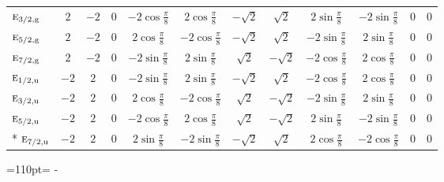 \documentclass[10pt,a4paper]{article}
\newcommand{\needspace}[1]{\par\penalty-100\begingroup\dimen0=#1\relax\dimen2=\pagegoal
  \advance\dimen2-\pagetotal\ifdim\dimen0>\dimen2\relax\ifdim\dimen2>0pt\vfil\break\fi\fi
  \endgroup}
\numberwithin{equation}{section}
\newcommand{\irr}[1]{\text{\normalfont\scshape #1}}
\newcommand{\ptag}[1]{\mathrm{#1}}
\begin{document}
{{\begin{longtable}{@{}lccccccccccc@{}}
$\irr{e}_{3/2,\ptag{g}}$ & $2$ & $-2$ & $0$ & $-2\cos\tfrac{\pi}{8}$ & $2\cos\tfrac{\pi}{8}$ & $-\sqrt{2}$ & $\sqrt{2}$ & $2\sin\tfrac{\pi}{8}$ & $-2\sin\tfrac{\pi}{8}$ & $0$ & $0$\\
$\irr{e}_{5/2,\ptag{g}}$ & $2$ & $-2$ & $0$ & $2\cos\tfrac{\pi}{8}$ & $-2\cos\tfrac{\pi}{8}$ & $-\sqrt{2}$ & $\sqrt{2}$ & $-2\sin\tfrac{\pi}{8}$ & $2\sin\tfrac{\pi}{8}$ & $0$ & $0$\\
$\irr{e}_{7/2,\ptag{g}}$ & $2$ & $-2$ & $0$ & $-2\sin\tfrac{\pi}{8}$ & $2\sin\tfrac{\pi}{8}$ & $\sqrt{2}$ & $-\sqrt{2}$ & $-2\cos\tfrac{\pi}{8}$ & $2\cos\tfrac{\pi}{8}$ & $0$ & $0$\\
$\irr{e}_{1/2,\ptag{u}}$ & $-2$ & $2$ & $0$ & $-2\sin\tfrac{\pi}{8}$ & $2\sin\tfrac{\pi}{8}$ & $-\sqrt{2}$ & $\sqrt{2}$ & $-2\cos\tfrac{\pi}{8}$ & $2\cos\tfrac{\pi}{8}$ & $0$ & $0$\\
$\irr{e}_{3/2,\ptag{u}}$ & $-2$ & $2$ & $0$ & $2\cos\tfrac{\pi}{8}$ & $-2\cos\tfrac{\pi}{8}$ & $\sqrt{2}$ & $-\sqrt{2}$ & $-2\sin\tfrac{\pi}{8}$ & $2\sin\tfrac{\pi}{8}$ & $0$ & $0$\\
$\irr{e}_{5/2,\ptag{u}}$ & $-2$ & $2$ & $0$ & $-2\cos\tfrac{\pi}{8}$ & $2\cos\tfrac{\pi}{8}$ & $\sqrt{2}$ & $-\sqrt{2}$ & $2\sin\tfrac{\pi}{8}$ & $-2\sin\tfrac{\pi}{8}$ & $0$ & $0$\\*
$\irr{e}_{7/2,\ptag{u}}$ & $-2$ & $2$ & $0$ & $2\sin\tfrac{\pi}{8}$ & $-2\sin\tfrac{\pi}{8}$ & $-\sqrt{2}$ & $\sqrt{2}$ & $2\cos\tfrac{\pi}{8}$ & $-2\cos\tfrac{\pi}{8}$ & $0$ & $0$\\
\bottomrule\end{longtable}}}
\needspace{110pt}
\end{document}
